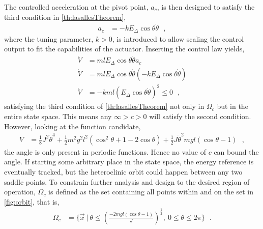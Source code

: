 %
The controlled acceleration at the pivot point, $a_c$, is then designed to satisfy the third condition in \autoref{th:lasallesTheorem},
\begin{align}
  a_c &= -k E_\Delta \cos \theta \dot{\theta}  \ \ \ ,  \label{eq:accControlLaw}
\end{align}
where the tuning parameter, $k>0$, is introduced to allow scaling the control output to fit the capabilities of the actuator. Inserting the control law yields,
\begin{align}
  \dot{V} &= m l E_\Delta \cos \theta \dot{\theta} a_c  \\
  \dot{V} &= m l E_\Delta \cos \theta \dot{\theta} (-k E_\Delta \cos \theta \dot{\theta})     \label{eq:lyapunovDerivativeControlled1} \\
  \dot{V} &= -k m l (E_\Delta \cos \theta \dot{\theta})^2  \leq 0  \ \ \ ,   \label{eq:lyapunovDerivativeControlled2} 
\end{align}
satisfying the third condition of \autoref{th:lasallesTheorem} not only in $\Omega_c$ but in the entire state space. This means any $\infty>c>0$ will satisfy the second condition. However, looking at the function candidate,
\begin{align}
V &= \tfrac{1}{8} J^2 \dot{\theta}^4 + \tfrac{1}{2} m^2 g^2 l^2 ( \cos^2 \theta + 1 -2\cos \theta )  +  \tfrac{1}{2} J \dot{\theta}^2  m g l (\cos \theta -1)  \ \ \ , \label{eq:functionCandidate3}
\end{align}
the angle is only present in periodic functions. Hence no value of $c$ can bound the angle. If starting some arbitrary place in the state space, the energy reference is eventually tracked, but the heteroclinic orbit could happen between any two saddle points. To constrain further analysis and design to the desired region of operation, $\Omega_c$ is defined as the set containing all points within and on the set in \autoref{fig:orbit}, that is,
\begin{align}
  \Omega_c &=  \{ \vec{x} \ | \ \dot{\theta} \leq \left(\frac{-2 m g l (\cos \theta -1)}{J}\right)^{\tfrac{1}{2}} , \ 0 \leq \theta \leq 2 \pi  \} \ \ \ . \label{eq:omegaC}
\end{align}
%
